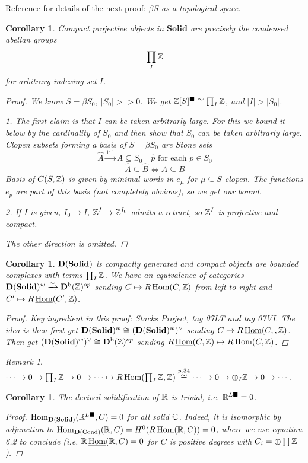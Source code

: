 \documentclass[A4paper, british, reqno]{amsart}
\theoremstyle{darkgreentheorem}
\newtheorem{cor}[thm]{Corollary}
\theoremstyle{darkbluedefinition}
\theoremstyle{darkredexample}
\theoremstyle{remark}
\newtheorem{rem}[thm]{Remark}
\DeclareMathOperator{\Hom}{Hom}
\DeclareMathOperator{\Cond}{Cond}
\DeclareMathOperator{\ihom}{\underline{Hom}}
\newcommand{\Solid}{\mathbf{Solid}}
\newcommand{\1}{\mathbbm{1}}
\newcommand{\op}{\oplus}
\newcommand{\dual}{^{\vee}}
\newcommand{\sub}{\subseteq}
\newcommand{\solid}{^{\blacksquare}}
\newcommand{\dsolid}{^{L\blacksquare}}
\begin{document}
Reference for details of the next proof: \textit{$\beta S$ as a topological space}.
\begin{cor}
    Compact projective objects in $\Solid$ are precisely the condensed abelian groups
    \[ \prod_{I} \mathbb{Z} \]
    for arbitrary indexing set $I$.
    \begin{proof}
	We know $S=\beta S_{0}$, $|S_{0}|>> 0$.
	We get $\Z[S]\solid \cong \prod_{I}\Z$, and $|I|>|S_{0}|$.
	
	1. The first claim is that $I$ can be taken arbitrarly large.
	For this we bound it below by the cardinality of $S_{0}$ and then show that $S_{0}$ can be taken arbitrarly large.
	Clopen subsets forming a basis of $S=\beta S_{0}$ are \textit{Stone sets}
	\[ \hat{A}\overset{1:1}{\longrightarrow} A\sub S_{0} \quad \hat{p} \text{ for each }p\in S_{0}\]
	\[ \hat{A}\sub \hat{B} \Leftrightarrow A\sub B\]
	Basis of $C(S,\mathbb{Z})$ is given by minimal words in $e_{\mu}$ for $\mu\sub S$ clopen.
	The functions $e_{\hat{p}}$ are part of this basis (not completely obvious), so we get our bound.

	2. If $I$ is given, $I_{0}\to I$, $\mathbb{Z}^{I}\to \mathbb{Z}^{I_{0}}$ admits a retract, so $\mathbb{Z}^{I}$ is projective and compact.

	The other direction is omitted.
    \end{proof}
\end{cor}

\begin{cor}
    $\D(\Solid)$ is compactly generated and compact objects are bounded complexes with terms $\prod_{I}\mathbb{Z}$.
    We have an equivalence of categories $\D(\Solid)^{w}\xrightarrow{\sim} \Db(\Z)^{op}$ sending $C\mapsto R\Hom(C,\Z)$ from left to right and $C'\mapsto R\ihom(C',\Z)$.
    \begin{proof}
	Key ingredient in this proof: Stacks Project, tag 07LT and tag 07VI.
	The idea is then first get $\D(\Solid)^{w}\cong (\D(\Solid)^{w})\dual $ sending $C\mapsto R\ihom(C,,\Z)$.
	Then get $(\D(\Solid)^{w})\dual \cong \Db(\Z)^{op}$ sending $R\ihom(C,\Z)\mapsto R\Hom(C,\Z)$.
    \end{proof}
\end{cor}

\begin{rem}
    $\cdots \to 0 \to \prod_{I}\Z \to 0 \to \cdots \mapsto R\Hom(\prod_{I}\Z,\Z)\overset{p. 34}{\cong} \cdots \to 0\to \op_{I}\Z\to 0\to \cdots $.
\end{rem}

\begin{cor}
    The derived solidification of $\mathbb{R}$ is trivial, i.e. $\R\dsolid=0$.
    \begin{proof}
	$\Hom_{\D(\Solid)}(\R\dsolid,C)=0$ for all solid $\mathbb{C}$.
	Indeed, it is isomorphic by adjunction to $\Hom_{\D(\Cond)}(\R,C)=H^{0}(R\Hom(\R,C))=0$, where we use equation 6.2 to conclude (i.e. $\R\ihom(\R,C)=0$ for $C$ is positive degrees with $C_{i}=\op\prod\Z$).
    \end{proof}
\end{cor}
\end{document}
